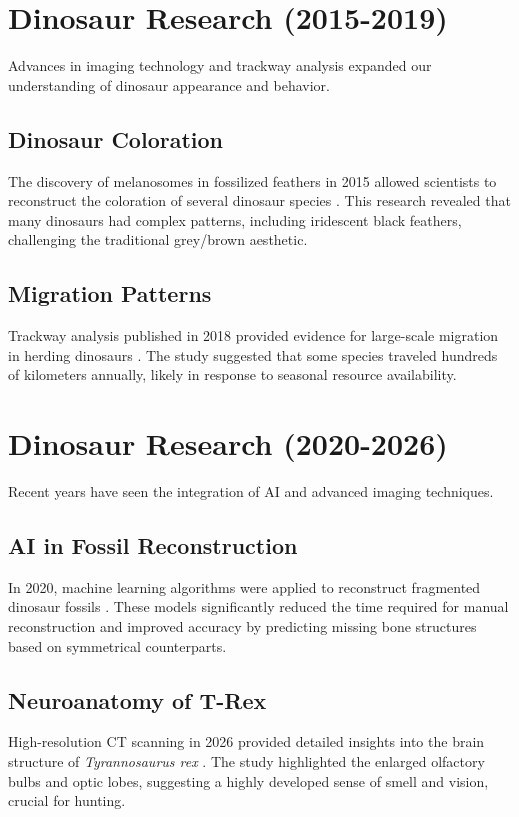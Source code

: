 \documentclass[12pt, a4paper]{article}
\begin{document}
\section{Dinosaur Research (2015-2019)}

Advances in imaging technology and trackway analysis expanded our understanding of dinosaur appearance and behavior.

\subsection{Dinosaur Coloration}
The discovery of melanosomes in fossilized feathers in 2015 allowed scientists to reconstruct the coloration of several dinosaur species \cite{dinosaur_color}. This research revealed that many dinosaurs had complex patterns, including iridescent black feathers, challenging the traditional grey/brown aesthetic.

\subsection{Migration Patterns}
Trackway analysis published in 2018 provided evidence for large-scale migration in herding dinosaurs \cite{dinosaur_migration}. The study suggested that some species traveled hundreds of kilometers annually, likely in response to seasonal resource availability.

\section{Dinosaur Research (2020-2026)}

Recent years have seen the integration of AI and advanced imaging techniques.

\subsection{AI in Fossil Reconstruction}
In 2020, machine learning algorithms were applied to reconstruct fragmented dinosaur fossils \cite{ai_fossil}. These models significantly reduced the time required for manual reconstruction and improved accuracy by predicting missing bone structures based on symmetrical counterparts.

\subsection{Neuroanatomy of T-Rex}
High-resolution CT scanning in 2026 provided detailed insights into the brain structure of \textit{Tyrannosaurus rex} \cite{trex_neuro}. The study highlighted the enlarged olfactory bulbs and optic lobes, suggesting a highly developed sense of smell and vision, crucial for hunting.
\end{document}
